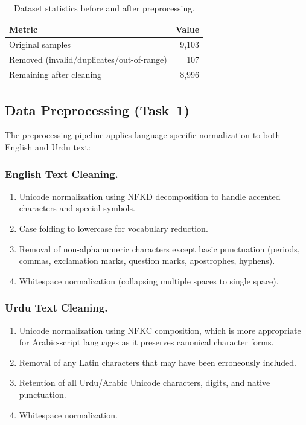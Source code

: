 \documentclass[runningheads]{llncs}
\begin{document}
\begin{table}[H]
\centering
\caption{Dataset statistics before and after preprocessing.}
\label{tab:dataset_raw}
\begin{tabular}{@{}lr@{}}
\toprule
\textbf{Metric} & \textbf{Value} \\
\midrule
Original samples         & 9,103 \\
Removed (invalid/duplicates/out-of-range) & 107 \\
Remaining after cleaning & 8,996 \\
\bottomrule
\end{tabular}
\end{table}

\subsection{Data Preprocessing (Task~1)}

The preprocessing pipeline applies language-specific normalization to both English and Urdu text:

\subsubsection{English Text Cleaning.}
\begin{enumerate}
    \item Unicode normalization using NFKD decomposition to handle accented characters and special symbols.
    \item Case folding to lowercase for vocabulary reduction.
    \item Removal of non-alphanumeric characters except basic punctuation (periods, commas, exclamation marks, question marks, apostrophes, hyphens).
    \item Whitespace normalization (collapsing multiple spaces to single space).
\end{enumerate}

\subsubsection{Urdu Text Cleaning.}
\begin{enumerate}
    \item Unicode normalization using NFKC composition, which is more appropriate for Arabic-script languages as it preserves canonical character forms.
    \item Removal of any Latin characters that may have been erroneously included.
    \item Retention of all Urdu/Arabic Unicode characters, digits, and native punctuation.
    \item Whitespace normalization.
\end{enumerate}
\end{document}
